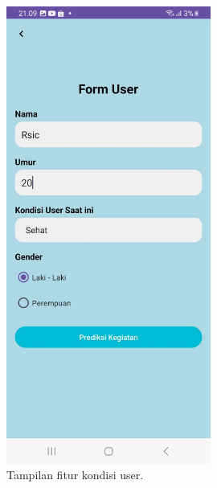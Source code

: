 \documentclass[journal,article,submit,pdftex,moreauthors]{Definitions/mdpi}
\begin{document}
\begin{figure}[H]
    \centering
    \includegraphics[width=0.6\textwidth]{Definitions/images/06.jpeg}
    \caption{Tampilan fitur kondisi user.}
    \label{fig:settings}
\end{figure}
\end{document}
